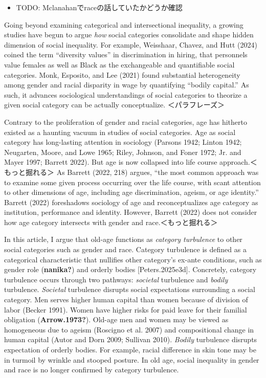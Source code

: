 \documentclass[
  letterpaper,
  DIV=11,
  numbers=noendperiod]{scrartcl}
\providecommand{\tightlist}{%
  \setlength{\itemsep}{0pt}\setlength{\parskip}{0pt}}\usepackage{longtable,booktabs,array}
\theoremstyle{paper}
\begin{document}
\begin{itemize}
\tightlist
\item
  TODO: Mclanahanでraceの話していたかどうか確認
\end{itemize}

Going beyond examining categorical and intersectional inequality, a
growing studies have begun to argue \emph{how} social categories
consolidate and shape hidden dimension of social inequality. For
example, Weisshaar, Chavez, and Hutt (2024) coined the term ``diversity
values'' in discrimination in hiring, that personnels value females as
well as Black as the exchangeable and quantifiable social categories.
Monk, Esposito, and Lee (2021) found substantial heterogeneity among
gender and racial disparity in wage by quantifying ``bodily capital.''
As such, it advances sociological understandings of social categories to
theorize a given social category can be actually conceptualize.
＜パラフレーズ＞

Contrary to the proliferation of gender and racial categories, age has
hitherto existed as a haunting vacuum in studies of social categories.
Age as social category has long-lasting attention in sociology (Parsons
1942; Linton 1942; Neugarten, Moore, and Lowe 1965; Riley, Johnson, and
Foner 1972; Jr. and Mayer 1997; Barrett 2022). But age is now collapsed
into life course approach.＜もっと掘れる＞ As Barrett (2022, 218)
argues, ``the most common approach was to examine some given process
occurring over the life course, with scant attention to other dimensions
of age, including age discrimination, ageism, or age identity.'' Barrett
(2022) foreshadows sociology of age and reconceptualizes age category as
institution, performance and identity. However, Barrett (2022) does not
consider how age category intersects with gender and
race.＜もっと掘れる＞

In this article, I argue that old-age functions as \emph{category
turbulence} to other social categories such as gender and race. Category
turbulence is defined as a categorical characteristic that nullifies
other category's ex-ante conditions, such as gender role
(\textbf{nanika?}) and orderly bodies {[}Peters.2025e3d{]}. Concretely,
category turbulence occurs through two pathways: \emph{societal}
turbulence and \emph{bodily} turbulence. \emph{Societal} turbulence
disrupts social expectations surrounding a social category. Men serves
higher human capital than women because of division of labor (Becker
1991). Women have higher risks for paid leave for their familial
obligation (\textbf{Arrow.1973?}). Old-age men and women may be viewed
as homogeneous due to ageism (Roscigno et al. 2007) and compositional
change in human capital (Autor and Dorn 2009; Sullivan 2010).
\emph{Bodily} turbulence disrupts expectation of orderly bodies. For
example, racial difference in skin tone may be in turmoil by wrinkle and
stooped posture. In old age, social inequality in gender and race is no
longer confirmed by category turbulence.
\end{document}
